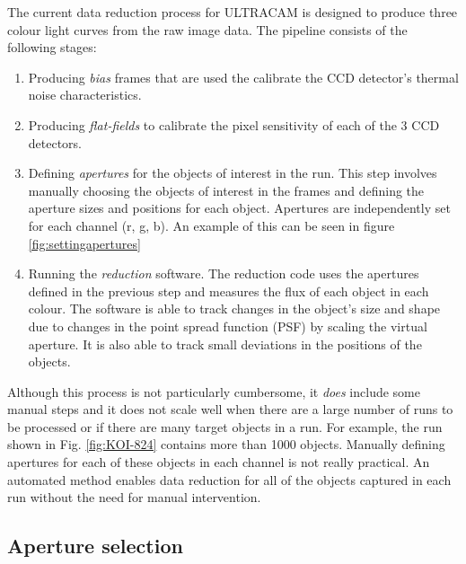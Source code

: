 The current data reduction process for ULTRACAM is designed to produce three colour light curves from the raw image data. The pipeline consists of the following stages:
\begin{enumerate}
	\item Producing \emph{bias} frames that are used the calibrate the CCD detector's thermal noise characteristics. 
	\item Producing \emph{flat-fields} to calibrate the pixel sensitivity of each of the 3 CCD detectors. 
	\item Defining \emph{apertures} for the objects of interest in the run. This step involves manually choosing the objects of interest in the frames and defining the aperture sizes and positions for each object. Apertures are independently set for each channel (r, g, b). An example of this can be seen in figure \ref{fig:settingapertures}
	\item Running the \emph{reduction} software. The reduction code uses the apertures defined in the previous step and measures the flux of each object in each colour. The software is able to track changes in the object's size and shape due to changes in the point spread function (PSF) by scaling the virtual aperture. It is also able to track small deviations in the positions of the objects. 
\end{enumerate} 
Although this process is not particularly cumbersome, it \emph{does} include some manual steps and it does not scale well when there are a large number of runs to be processed or if there are many target objects in a run. For example, the run shown in Fig. \ref{fig:KOI-824} contains more than 1000 objects. Manually defining apertures for each of these objects in each channel is not really practical. An automated method enables data reduction for all of the objects captured in each run without the need for manual intervention. 

\subsection{Aperture selection}

